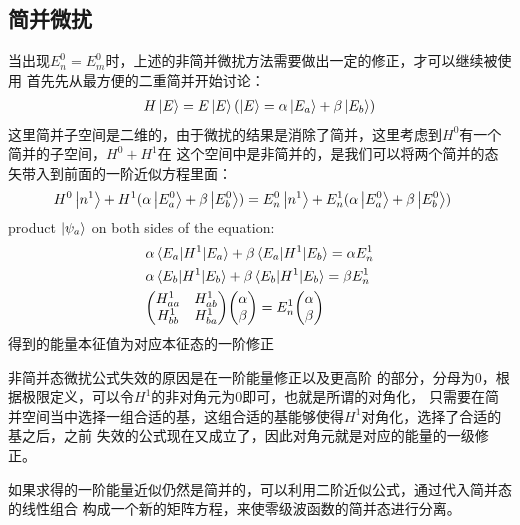 \documentclass[UTF8]{article}
\numberwithin{equation}{section}
\begin{document}
\subsection{简并微扰}
当出现$E_n^0=E_m^0$时，上述的非简并微扰方法需要做出一定的修正，才可以继续被使用
首先先从最方便的二重简并开始讨论：
\begin{align*}
    H\ket{E}=E\ket{E}(\ket{E}=\alpha\ket{E_a}+\beta\ket{E_b})
\end{align*}
这里简并子空间是二维的，由于微扰的结果是消除了简并，这里考虑到$H^0$有一个简并的子空间，$H^0+H^1$在
这个空间中是非简并的，是我们可以将两个简并的态矢带入到前面的一阶近似方程里面：
\begin{align*}
     & H^0\ket{n^1}+H^1(\alpha\ket{E_a^0}+\beta\ket{E_b^0})=E_n^0\ket{n^1}+E_n^1
    (\alpha\ket{E_a^0}+\beta\ket{E_b^0})
\end{align*}
product $\ket{\psi_a}$ on both sides of the equation:
\begin{align*}
     & \alpha\mel{E_a}{H^1}{E_a}+\beta\mel{E_a}{H^1}{E_b}=\alpha E_n^1            \\
     & \alpha\mel{E_b}{H^1}{E_b}+\beta\mel{E_b}{H^1}{E_b}=\beta E_n^1             \\
     & \mqty(H_{aa}^1                                                  & H_{ab}^1 \\H_{bb}^1&H_{ba}^1)\mqty(\alpha\\ \beta)=E_n^1\mqty
    (\alpha                                                                       \\\beta)
\end{align*}
得到的能量本征值为对应本征态的一阶修正

\begin{tcolorbox}[colframe=red!75!]
非简并态微扰公式失效的原因是在一阶能量修正以及更高阶
的部分，分母为0，根据极限定义，可以令$H^1$的非对角元为0即可，也就是所谓的对角化，
只需要在简并空间当中选择一组合适的基，这组合适的基能够使得$H^1$对角化，选择了合适的基之后，之前
失效的公式现在又成立了，因此对角元就是对应的能量的一级修正。
\end{tcolorbox}


如果求得的一阶能量近似仍然是简并的，可以利用二阶近似公式，通过代入简并态的线性组合
构成一个新的矩阵方程，来使零级波函数的简并态进行分离。
\end{document}
